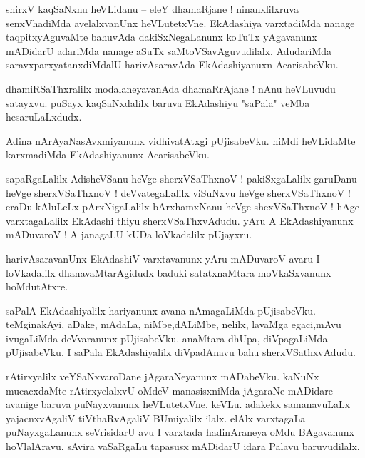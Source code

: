 \documentclass{article}
\begin{document}
\begin{mn}%
shirxV kaqSaNxnu heVLidanu -- eleY dhamaRjane ! ninanxlilxruva senxVhadiMda avelalxvanUnx 
heVLutetxVne. EkAdashiya varxtadiMda nanage taqpitxyAguvaMte bahuvAda dakiSxNegaLanunx koTuTx 
yAgavanunx mADidarU adariMda nanage aSuTx saMtoVSavAguvudilalx. AdudariMda saravxparxyatanxdiMdalU 
harivAsaravAda EkAdashiyanuxn AcarisabeVku.
\end{mn}

\begin{mn}%
dhamiRSaThxralilx modalaneyavanAda dhamaRrAjane ! nAnu heVLuvudu satayxvu. puSayx kaqSaNxdalilx 
baruva EkAdashiyu "saPala" veMba hesaruLaLxdudx.
\end{mn}

\begin{mn}%
Adina nArAyaNasAvxmiyanunx vidhivatAtxgi pUjisabeVku. hiMdi heVLidaMte karxmadiMda EkAdashiyanunx 
AcarisabeVku.
\end{mn}

\begin{mn}%
sapaRgaLalilx AdisheVSanu heVge sherxVSaThxnoV ! pakiSxgaLalilx garuDanu heVge sherxVSaThxnoV ! 
deVvategaLalilx viSuNxvu heVge sherxVSaThxnoV ! eraDu kAluLeLx pArxNigaLalilx bArxhamxNanu heVge 
shexVSaThxnoV ! hAge varxtagaLalilx EkAdashi thiyu sherxVSaThxvAdudu. yAru A EkAdashiyanunx 
mADuvaroV ! A janagaLU kUDa loVkadalilx pUjayxru.
\end{mn}

\begin{mn}%
harivAsaravanUnx EkAdashiV varxtavanunx yAru mADuvaroV avaru I loVkadalilx dhanavaMtarAgidudx 
baduki satatxnaMtara moVkaSxvanunx hoMdutAtxre.
\end{mn}

\begin{mn}%
saPalA EkAdashiyalilx hariyanunx avana nAmagaLiMda pUjisabeVku. teMginakAyi, aDake, mAdaLa, 
niMbe,dALiMbe, nelilx, lavaMga egaci,mAvu ivugaLiMda deVvaranunx pUjisabeVku. anaMtara dhUpa, 
diVpagaLiMda pUjisabeVku. I saPala EkAdashiyalilx diVpadAnavu bahu sherxVSathxvAdudu.
\end{mn}

\begin{mn}%
rAtirxyalilx veYSaNxvaroDane jAgaraNeyanunx mADabeVku. kaNuNx mucacxdaMte rAtirxyelalxvU oMdeV 
manasisxniMda jAgaraNe mADidare avanige baruva puNayxvanunx heVLutetxVne. keVLu. adakekx 
samanavuLaLx yajacnxvAgaliV tiVthaRvAgaliV BUmiyalilx ilalx. elAlx varxtagaLa puNayxgaLanunx 
seVrisidarU avu I varxtada hadinAraneya oMdu BAgavanunx hoVlalAravu. sAvira vaSaRgaLu tapasusx 
mADidarU idara Palavu baruvudilalx.
\end{mn}
\end{document}
